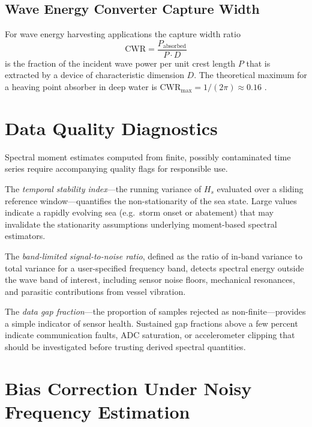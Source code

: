 \documentclass[journal]{IEEEtran}
\begin{document}
    \subsection{Wave Energy Converter Capture Width}

    For wave energy harvesting applications the capture width ratio
    \begin{equation}
        \mathrm{CWR} = \frac{P_\mathrm{absorbed}}{P \cdot D}
    \end{equation}
    is the fraction of the incident wave power per unit crest length $P$
    that is extracted by a device of characteristic dimension $D$.
    The theoretical maximum for a heaving point absorber in deep water
    is $\mathrm{CWR}_\mathrm{max} = 1/(2\pi) \approx 0.16$ \cite{Evans1976}.

    \section{Data Quality Diagnostics}
    \label{sec:quality}

    Spectral moment estimates computed from finite, possibly contaminated
    time series require accompanying quality flags for responsible use.

    The \emph{temporal stability index}---the running variance of $H_s$
    evaluated over a sliding reference window---quantifies the
    non-stationarity of the sea state.
    Large values indicate a rapidly evolving sea (e.g.\ storm onset or
    abatement) that may invalidate the stationarity assumptions underlying
    moment-based spectral estimators.

    The \emph{band-limited signal-to-noise ratio}, defined as the ratio of
    in-band variance to total variance for a user-specified frequency band,
    detects spectral energy outside the wave band of interest, including
    sensor noise floors, mechanical resonances, and parasitic contributions
    from vessel vibration.

    The \emph{data gap fraction}---the proportion of samples rejected as
    non-finite---provides a simple indicator of sensor health.
    Sustained gap fractions above a few percent indicate communication
    faults, ADC saturation, or accelerometer clipping that should be
    investigated before trusting derived spectral quantities.

    \section{Bias Correction Under Noisy Frequency Estimation}
    \label{sec:bias}
\end{document}

